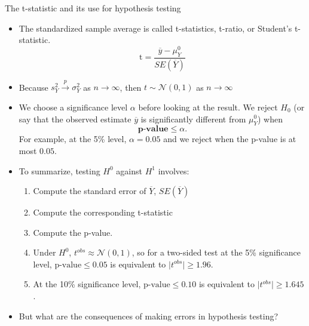 \documentclass[notes,10pt, aspectratio=169]{beamer}
\begin{document}
\begin{frame}{The t-statistic and its use for hypothesis testing}
\begin{itemize}
    \item The standardized sample average is called t-statistics, t-ratio, or Student's t-statistic.
    \begin{equation*}
        \text{t} = \frac{\overline{y}-\mu_Y^0}{SE(\overline{Y})}
    \end{equation*}
    \item Because $s_Y^2 \xrightarrow{\mathit{p}}\sigma^2_Y$ as $n\rightarrow\infty$, then  $t\sim\mathcal{N}(0,1)$ as $n\rightarrow\infty$
    \item We choose a significance level $\alpha$ before looking at the result. We reject $H_0$ (or say that the observed estimate $\overline{y}$ is significantly different from $\mu_Y^0$) when
    \[
        \textbf{p-value}\leq\alpha.
    \]
    For example, at the 5\% level, $\alpha=0.05$ and we reject when the p-value is at most $0.05$.
    \item To summarize, testing $H^0$ against $H^1$ involves:
    \begin{enumerate}
        \item Compute the standard error of $\overline{Y}$, $SE(\overline{Y})$
        \item Compute the corresponding t-statistic
        \item Compute the p-value.
        \item Under $H^0$, $t^{obs}\approx\mathcal{N}(0,1)$, so for a two-sided test at the 5\% significance level, $\text{p-value}\leq 0.05$ is equivalent to $\mid t^{obs}\mid\geq 1.96$.
        \item At the 10\% significance level, $\text{p-value}\leq 0.10$ is equivalent to $\mid t^{obs}\mid\geq 1.645$.
    \end{enumerate}
    \item But what are the consequences of making errors in hypothesis testing?
\end{itemize}
\end{frame}
\end{document}
